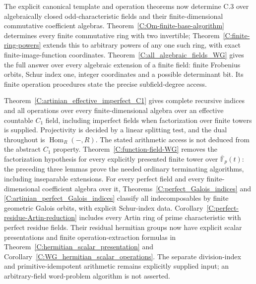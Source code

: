 \begin{remark}
\label{C:BO_general_gate}
The explicit canonical template and operation theorems now determine
C.3 over algebraically closed odd-characteristic fields and their
finite-dimensional commutative coefficient algebras.
Theorem~\ref{C:Om-finite-base-algorithm} determines every finite
commutative ring with two invertible; Theorem~\ref{C:finite-ring-powers}
extends this to arbitrary powers of any one such ring, with exact
finite-image-function coordinates.
Theorem~\ref{C:all_algebraic_fields_WG} gives the full answer over
every algebraic extension of a finite field: finite Frobenius orbits,
Schur index one, integer coordinates and a possible determinant bit.
Its finite operation procedures state the precise subfield-degree access.

Theorem~\ref{C:artinian_effective_imperfect_C1} gives complete recursive
indices and all operations over every finite-dimensional algebra over
an effective countable $C_1$ field, including imperfect fields when
factorization over finite towers is supplied. Projectivity is decided
by a linear splitting test, and the dual throughout is $\operatorname{Hom}_R(-,R)$.
The stated arithmetic access is not deduced from the abstract $C_1$ property.
Theorem~\ref{C:function-field-WG} removes the factorization hypothesis
for every explicitly presented finite tower over $\overline{\mathbb F}_p(t)$:
the preceding three lemmas prove the needed ordinary terminating algorithms,
including inseparable extensions.
For every perfect field and every finite-dimensional coefficient algebra
over it, Theorems~\ref{C:perfect_Galois_indices} and
\ref{C:artinian_perfect_Galois_indices} classify all indecomposables
by finite geometric Galois orbits, with explicit Schur-index data.
Corollary~\ref{C:perfect-residue-Artin-reduction} includes every Artin
ring of prime characteristic with perfect residue fields.
Their residual hermitian groups now have explicit scalar presentations
and finite operation-extraction formulas in
Theorem~\ref{C:hermitian_scalar_presentation} and
Corollary~\ref{C:WG_hermitian_scalar_operations}.
The separate division-index and primitive-idempotent arithmetic remains
explicitly supplied input; an arbitrary-field word-problem algorithm
is not asserted.


\end{remark}
